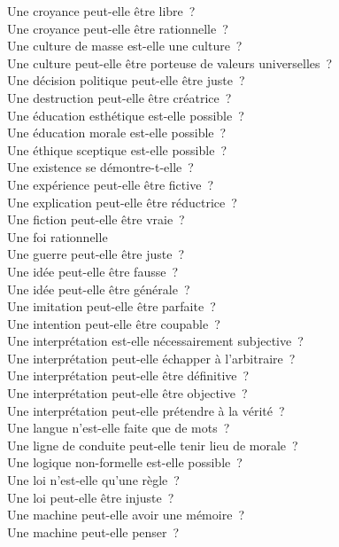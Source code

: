 \documentclass[a4paper,12pt]{article}
\begin{document}
Une croyance peut-elle être libre ? \\
Une croyance peut-elle être rationnelle ? \\
Une culture de masse est-elle une culture ? \\
Une culture peut-elle être porteuse de valeurs universelles ? \\
Une décision politique peut-elle être juste ? \\
Une destruction peut-elle être créatrice ? \\
Une éducation esthétique est-elle possible ? \\
Une éducation morale est-elle possible ? \\
Une éthique sceptique est-elle possible ? \\
Une existence se démontre-t-elle ? \\
Une expérience peut-elle être fictive ? \\
Une explication peut-elle être réductrice ? \\
Une fiction peut-elle être vraie ? \\
Une foi rationnelle \\
Une guerre peut-elle être juste ? \\
Une idée peut-elle être fausse ? \\
Une idée peut-elle être générale ? \\
Une imitation peut-elle être parfaite ? \\
Une intention peut-elle être coupable ? \\
Une interprétation est-elle nécessairement subjective ? \\
Une interprétation peut-elle échapper à l'arbitraire ? \\
Une interprétation peut-elle être définitive ? \\
Une interprétation peut-elle être objective ? \\
Une interprétation peut-elle prétendre à la vérité ? \\
Une langue n'est-elle faite que de mots ? \\
Une ligne de conduite peut-elle tenir lieu de morale ? \\
Une logique non-formelle est-elle possible ? \\
Une loi n'est-elle qu'une règle ? \\
Une loi peut-elle être injuste ? \\
Une machine peut-elle avoir une mémoire ? \\
Une machine peut-elle penser ? \\
\end{document}
